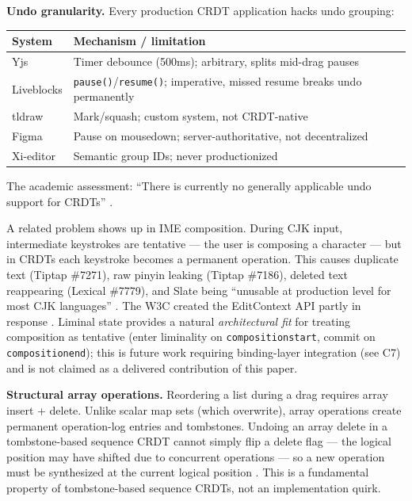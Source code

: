 \textbf{Undo granularity.} Every production CRDT application hacks undo grouping:

\begin{table}[h]
\footnotesize
\centering
\begin{tabularx}{\columnwidth}{@{}lX@{}}
\toprule
\textbf{System} & \textbf{Mechanism / limitation} \\
\midrule
Yjs \cite{yjs:undomanager} & Timer debounce (500ms); arbitrary, splits mid-drag pauses \\
Liveblocks \cite{liveblocks:undo} & \texttt{pause()}/\texttt{resume()}; imperative, missed resume breaks undo permanently \\
tldraw \cite{tldraw:undo} & Mark/squash; custom system, not CRDT-native \\
Figma \cite{figma:multiplayer} & Pause on mousedown; server-authoritative, not decentralized \\
Xi-editor \cite{xi:crdt} & Semantic group IDs; never productionized \\
\bottomrule
\end{tabularx}
\end{table}

The academic assessment: ``There is currently no generally applicable undo support for CRDTs'' \cite{yu2019opodis}.

A related problem shows up in IME composition. During CJK input, intermediate keystrokes are tentative --- the user is composing a character --- but in CRDTs each keystroke becomes a permanent operation. This causes duplicate text (Tiptap \#7271), raw pinyin leaking (Tiptap \#7186), deleted text reappearing (Lexical \#7779), and Slate being ``unusable at production level for most CJK languages'' \cite{slate:ime}. The W3C created the EditContext API partly in response \cite{w3c:editcontext}. Liminal state provides a natural \emph{architectural fit} for treating composition as tentative (enter liminality on \texttt{compositionstart}, commit on \texttt{compositionend}); this is future work requiring binding-layer integration (see C7) and is not claimed as a delivered contribution of this paper.

\textbf{Structural array operations.} Reordering a list during a drag requires array insert + delete. Unlike scalar map sets (which overwrite), array operations create permanent operation-log entries and tombstones. Undoing an array delete in a tombstone-based sequence CRDT cannot simply flip a delete flag --- the logical position may have shifted due to concurrent operations --- so a new operation must be synthesized at the current logical position \cite{yu2019opodis, yjs:internals}. This is a fundamental property of tombstone-based sequence CRDTs, not an implementation quirk.

